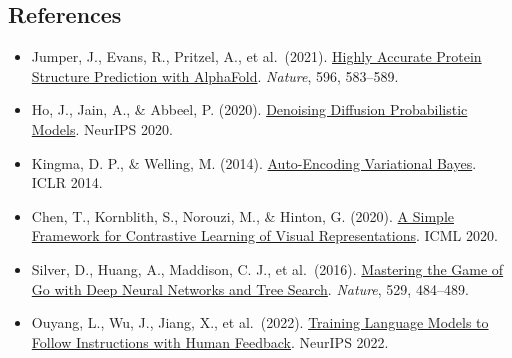 \FloatBarrier
{}
\hypertarget{references}{%
\subsection{References}\label{references}}

\vspace{0.25em}
\begin{itemize}
\tightlist
\item
  Jumper, J., Evans, R., Pritzel, A., et al.~(2021). \href{https://www.nature.com/articles/s41586-021-03819-2}{Highly Accurate Protein Structure Prediction with AlphaFold}. \emph{Nature}, 596, 583--589.
\item
  Ho, J., Jain, A., \& Abbeel, P. (2020). \href{https://proceedings.neurips.cc/paper/2020/hash/4c5bcfec8584af0d967f1ab10179ca4b-Abstract.html}{Denoising Diffusion Probabilistic Models}. NeurIPS 2020.
\item
  Kingma, D. P., \& Welling, M. (2014). \href{https://arxiv.org/abs/1312.6114}{Auto-Encoding Variational Bayes}. ICLR 2014.
\item
  Chen, T., Kornblith, S., Norouzi, M., \& Hinton, G. (2020). \href{https://proceedings.mlr.press/v119/chen20j.html}{A Simple Framework for Contrastive Learning of Visual Representations}. ICML 2020.
\item
  Silver, D., Huang, A., Maddison, C. J., et al.~(2016). \href{https://doi.org/10.1038/nature16961}{Mastering the Game of Go with Deep Neural Networks and Tree Search}. \emph{Nature}, 529, 484--489.
\item
  Ouyang, L., Wu, J., Jiang, X., et al.~(2022). \href{https://arxiv.org/abs/2203.02155}{Training Language Models to Follow Instructions with Human Feedback}. NeurIPS 2022.
\end{itemize}

\clearpage
